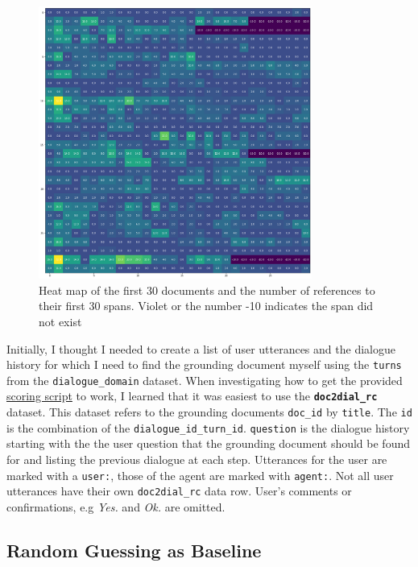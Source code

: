 \documentclass[11pt]{article}
\begin{document}
    \begin{figure}[h]
        \centering
        \includegraphics[width=0.8\textwidth]{sub_section_usage_of_spans}
        \caption{Heat map of the first 30 documents and the number of references to their first 30 spans. Violet or the number
        -10 indicates the span did not exist}
        \label{fig:heat-map-first-30-spans}
    \end{figure}

    Initially, I thought I needed to create a list of user utterances and the dialogue history for which I need to find the
    grounding document myself using the \texttt{turns} from the \texttt{dialogue\_domain} dataset. When investigating how
    to get the provided \href{https://github.com/doc2dial/sharedtask-dialdoc2021/blob/master/scripts/sharedtask_utils.py}{scoring script}
    to work, I learned that it was easiest to use the \textbf{\texttt{doc2dial\_rc}} dataset.
    This dataset refers to the grounding documents \texttt{doc\_id} by \texttt{title}.
    The \texttt{id} is the combination of the \texttt{dialogue\_id\_turn\_id}. \texttt{question} is the dialogue history starting
    with the the user question that the grounding document should be found for and listing the previous dialogue at each step.
    Utterances for the user are marked with a \texttt{user:}, those of the agent are marked with \texttt{agent:}. Not
    all user utterances have their own \texttt{doc2dial\_rc} data row. User's comments or confirmations, e.g \textit{Yes.} and
    \textit{Ok.} are omitted.

    \subsection{Random Guessing as Baseline}\label{subsec:random-guessing-results}
\end{document}
